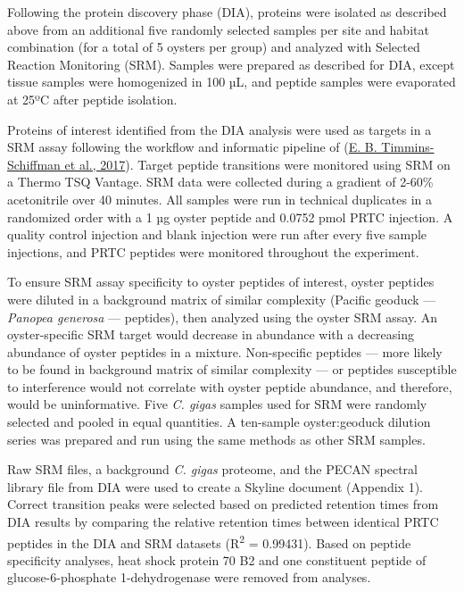 \documentclass [11pt, proquest] {uwthesis}[2015/03/03]
\begin{document}
Following the protein discovery phase (DIA), proteins were isolated as described above from an additional five randomly selected samples per site and habitat combination (for a total of 5 oysters per group) and analyzed with Selected Reaction Monitoring (SRM). Samples were prepared as described for DIA, except tissue samples were homogenized in 100 µL, and peptide samples were evaporated at 25ºC after peptide isolation.

Proteins of interest identified from the DIA analysis were used as targets in a SRM assay following the workflow and informatic pipeline of (\protect\hyperlink{ref-Timmins-Schiffman2017}{E. B. Timmins-Schiffman et al., 2017}). Target peptide transitions were monitored using SRM on a Thermo TSQ Vantage. SRM data were collected during a gradient of 2-60\% acetonitrile over 40 minutes. All samples were run in technical duplicates in a randomized order with a 1 µg oyster peptide and 0.0752 pmol PRTC injection. A quality control injection and blank injection were run after every five sample injections, and PRTC peptides were monitored throughout the experiment.

To ensure SRM assay specificity to oyster peptides of interest, oyster peptides were diluted in a background matrix of similar complexity (Pacific geoduck --- \emph{Panopea generosa} --- peptides), then analyzed using the oyster SRM assay. An oyster-specific SRM target would decrease in abundance with a decreasing abundance of oyster peptides in a mixture. Non-specific peptides --- more likely to be found in background matrix of similar complexity --- or peptides susceptible to interference would not correlate with oyster peptide abundance, and therefore, would be uninformative. Five \emph{C. gigas} samples used for SRM were randomly selected and pooled in equal quantities. A ten-sample oyster:geoduck dilution series was prepared and run using the same methods as other SRM samples.

Raw SRM files, a background \emph{C. gigas} proteome, and the PECAN spectral library file from DIA were used to create a Skyline document (Appendix 1). Correct transition peaks were selected based on predicted retention times from DIA results by comparing the relative retention times between identical PRTC peptides in the DIA and SRM datasets (R\textsuperscript{2} = 0.99431). Based on peptide specificity analyses, heat shock protein 70 B2 and one constituent peptide of
glucose-6-phosphate 1-dehydrogenase were removed from analyses.
\end{document}
